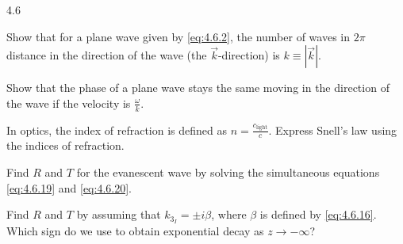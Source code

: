 \begin{exercises}{4.6}

\item Show that for a plane wave given by \eqref{eq:4.6.2}, the number of waves in $2\pi$ distance in the direction of the wave (the $\vec{k}$-direction) is $k \equiv |\vec{k}|$.

\item Show that the phase of a plane wave stays the same moving in the direction of the wave if the velocity is $\frac{\omega}{k}$.

\item In optics, the index of refraction is defined as $n = \frac{c_{\text{light}}}{c}$.  Express Snell's law using the indices of refraction.

\item Find $R$ and $T$ for the evanescent wave by solving the simultaneous equations \eqref{eq:4.6.19} and \eqref{eq:4.6.20}.

\item Find $R$ and $T$ by assuming that $k_{3_I} = \pm i\beta$, where $\beta$ is defined by \eqref{eq:4.6.16}.  Which sign do we use to obtain exponential decay as $z \to -\infty$?

\end{exercises}
